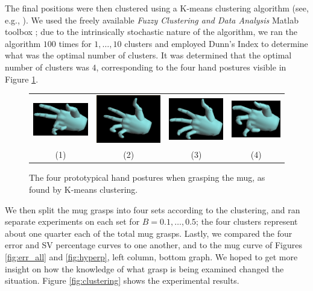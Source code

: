 The final positions were then clustered using a K-means clustering
algorithm (see, e.g., \cite{macqueen}). We used the freely available
\emph{Fuzzy Clustering and Data Analysis} Matlab toolbox
\cite{fctBalasko1,fctBalasko2}; due to the intrinsically stochastic
nature of the algorithm, we ran the algorithm $100$ times for
$1,\ldots,10$ clusters and employed Dunn's Index \cite{dunn} to
determine what was the optimal number of clusters. It was determined
that the optimal number of clusters was $4$, corresponding to the four
hand postures visible in Figure \ref{fig:postures}.

\begin{figure}[htbp]
  \begin{center}
    \begin{tabular}{cccc}
      \includegraphics[width=0.22\linewidth]{posture1.eps} &
      \includegraphics[width=0.22\linewidth]{posture2.eps} &
      \includegraphics[width=0.22\linewidth]{posture3.eps} &
      \includegraphics[width=0.22\linewidth]{posture4.eps} \\
      (1) & (2) & (3) & (4) \\
    \end{tabular}
    \caption{The four prototypical hand postures when grasping the
      mug, as found by K-means clustering.}
    \label{fig:postures}
  \end{center}
\end{figure}

We then split the mug grasps into four sets according to the
clustering, and ran separate experiments on each set for
$B=0.1,\ldots,0.5$; the four clusters represent about one quarter each
of the total mug grasps. Lastly, we compared the four error and SV
percentage curves to one another, and to the mug curve of Figures
\ref{fig:err_all} and \ref{fig:hyperp}, left column, bottom graph. We
hoped to get more insight on how the knowledge of what grasp is being
examined changed the situation. Figure \ref{fig:clustering} shows the
experimental results.

